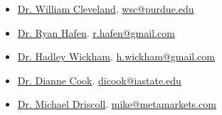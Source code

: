\documentclass[oneside]{article}
\begin{document}
  \begin{itemize}
  
    \item \href{http://www.stat.purdue.edu/~wsc/}{Dr. William Cleveland}. \href{mailto:wsc@purdue.edu}{wsc@purdue.edu}

    \item \href{https://www.linkedin.com/profile/view?id=47227110}{Dr. Ryan Hafen}. \href{mailto:r.hafen@gmail.com}{r.hafen@gmail.com}

    \item \href{http://had.co.nz/}{Dr. Hadley Wickham}.  \href{mailto:h.wickham@gmail.com}{h.wickham@gmail.com}

    \item \href{http://dicook.github.io/}{Dr. Dianne Cook}.  \href{mailto:dicook@iastate.edu}{dicook@iastate.edu}

    \item \href{https://www.linkedin.com/profile/view?id=413949}{Dr. Michael Driscoll}. \href{mailto:mike@metamarkets.com}{mike@metamarkets.com}

  \end{itemize}
  
\end{document}

